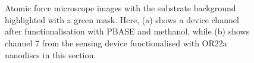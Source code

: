 \documentclass[
  a4paper,
]{scrbook}
\begin{document}
\begin{figure}
\begin{minipage}[t]{0.03\linewidth}
{\centering 


}

\end{minipage}%
%
\begin{minipage}[t]{0.01\linewidth}

{\centering 

~

}

\end{minipage}%
%
\begin{minipage}[t]{0.46\linewidth}

{\centering 


}

\end{minipage}%
%
\begin{minipage}[t]{0.01\linewidth}

{\centering 

~

}

\end{minipage}%

\caption{\label{fig-working-OR22a-masks}Atomic force microscope images
with the substrate background highlighted with a green mask. Here, (a)
shows a device channel after functionalisation with PBASE and methanol,
while (b) shows channel 7 from the sensing device functionalised with
OR22a nanodiscs in this section.}

\end{figure}
\end{document}
